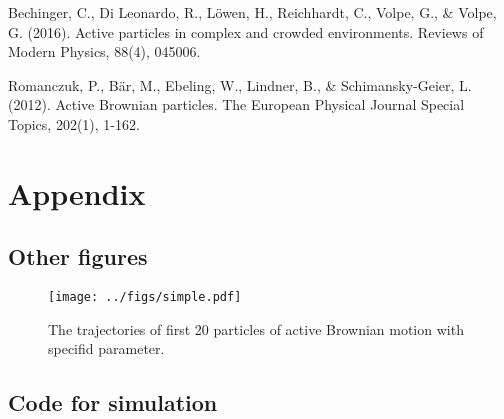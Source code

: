 \documentclass[runningheads]{llncs}
\begin{document}
\begin{thebibliography}{8}
    Bechinger, C., Di Leonardo, R., Löwen, H., Reichhardt, C., Volpe, G., \& Volpe, G. (2016). Active 
    particles in complex and crowded environments. Reviews of Modern Physics, 88(4), 045006. 

    Romanczuk, P., Bär, M., Ebeling, W., Lindner, B., \& Schimansky-Geier, L. (2012). Active Brownian 
    particles. The European Physical Journal Special Topics, 202(1), 1-162. 
\end{thebibliography}

\section*{Appendix}

\subsection*{Other figures}

\begin{figure}
    \centering
    \texttt{[image: ../figs/simple.pdf]}
    \caption{The trajectories of first 20 particles of active Brownian motion with specifid parameter.} 
    \label{fig:trajectories}
\end{figure}

\subsection*{Code for simulation}


    
\end{document}
